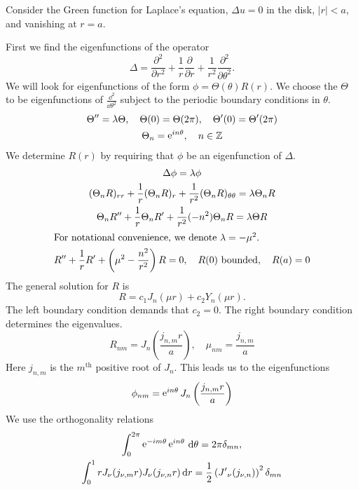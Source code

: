 \begin{Example}
  Consider the Green function for Laplace's equation, 
  $\Delta u = 0$ in the disk, $|r| < a$,
  and vanishing at $r = a$.

  First we find the eigenfunctions of the operator
  \[
  \Delta = \frac{\partial^2}{\partial r^2} + \frac{1}{r} \frac{\partial}{\partial r} 
  + \frac{1}{r^2} \frac{\partial^2}{\partial \theta^2}.
  \]
  We will look for eigenfunctions of the form
  $\phi = \Theta(\theta) R(r)$.  We choose the $\Theta$ to be 
  eigenfunctions of $\frac{\dd^2}{\dd \theta^2}$ subject to the periodic
  boundary conditions in $\theta$.
  \begin{gather*}
    \Theta'' = \lambda \Theta, \quad \Theta(0) = \Theta(2 \pi), \quad
    \Theta'(0) = \Theta'(2 \pi) \\
    \Theta_n = \mathop{\mathrm{e}}\nolimits^{i n \theta}, \quad n \in \mathbb{Z}
  \end{gather*}
  We determine $R(r)$ by requiring that $\phi$ be an eigenfunction
  of $\Delta$.
  \begin{gather*}
    \Delta \phi = \lambda \phi \\
    (\Theta_n R)_{r r} + \frac{1}{r} (\Theta_n R)_r
    + \frac{1}{r^2} (\Theta_n R)_{\theta \theta} 
    = \lambda \Theta_n R \\
    \Theta_n R'' + \frac{1}{r} \Theta_n R' 
    + \frac{1}{r^2} (-n^2) \Theta_n R = \lambda \Theta R \\
    \intertext{For notational convenience, we denote
      $\lambda = - \mu^2$.}
    R'' + \frac{1}{r} R' + \left( \mu^2 - \frac{n^2}{r^2} \right) R = 0,
    \quad R(0)\ \mathrm{bounded}, \quad R(a) = 0
  \end{gather*}
  The general solution for $R$ is
  \[
  R = c_1 J_{n}(\mu r) + c_2 Y_{n}(\mu r).
  \]
  The left boundary condition demands that $c_2 =0$.  The right boundary
  condition determines the eigenvalues.
  \[
  R_{n m} = J_{n} \left( \frac{j_{n,m} r}{a} \right), \quad
  \mu_{n m} = \frac{j_{n,m}}{a}
  \]
  Here $j_{n,m}$ is the $m^{\mathrm{th}}$ positive root of $J_n$.
  This leads us to the eigenfunctions
  \[
  \phi_{n m} = \mathop{\mathrm{e}}\nolimits^{i n \theta} J_{n} \left( \frac{j_{n,m} r}{a} \right)
  \]
  We use the orthogonality relations
  \begin{gather*}
    \int_0^{2 \pi}     \mathop{\mathrm{e}}\nolimits^{-i m \theta} \mathop{\mathrm{e}}\nolimits^{i n \theta} \,\mathrm{d} \theta
    = 2 \pi \delta_{m n}, \\
    \int_0^1 r J_\nu(j_{\nu,m} r) J_\nu(j_{\nu,n} r) \,\mathrm{d} r 
    = \frac{1}{2} \left( {J'}_\nu(j_{\nu,n}) \right)^2
    \delta_{m n}
  \end{gather*}

\end{Example}
